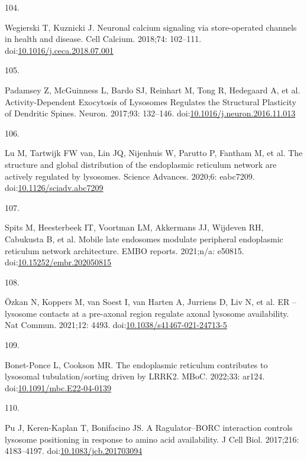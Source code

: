 \documentclass[
  12pt,
  a4paper,
]{book}
\newlength{\cslhangindent}
\newlength{\csllabelwidth}
\newlength{\cslentryspacingunit} %
\newenvironment{CSLReferences}[2] %
 {%
  \setlength{\parindent}{0pt}
  \ifodd #1
  \let\oldpar\par
  \def\par{\hangindent=\cslhangindent\oldpar}
  \fi
  \setlength{\parskip}{#2\cslentryspacingunit}
 }%
 {}
\newcommand{\CSLLeftMargin}[1]{\parbox[t]{\csllabelwidth}{#1}}
\newcommand{\CSLRightInline}[1]{\parbox[t]{\linewidth - \csllabelwidth}{#1}\break}
\begin{document}
\begin{CSLReferences}{0}{0}
\leavevmode{}%
\CSLLeftMargin{104. }%
\CSLRightInline{Wegierski T, Kuznicki J. Neuronal calcium signaling via store-operated channels in health and disease. Cell Calcium. 2018;74: 102--111. doi:\href{https://doi.org/10.1016/j.ceca.2018.07.001}{10.1016/j.ceca.2018.07.001}}

\leavevmode{}%
\CSLLeftMargin{105. }%
\CSLRightInline{Padamsey Z, McGuinness L, Bardo SJ, Reinhart M, Tong R, Hedegaard A, et al. Activity-{Dependent Exocytosis} of {Lysosomes Regulates} the {Structural Plasticity} of {Dendritic Spines}. Neuron. 2017;93: 132--146. doi:\href{https://doi.org/10.1016/j.neuron.2016.11.013}{10.1016/j.neuron.2016.11.013}}

\leavevmode{}%
\CSLLeftMargin{106. }%
\CSLRightInline{Lu M, Tartwijk FW van, Lin JQ, Nijenhuis W, Parutto P, Fantham M, et al. The structure and global distribution of the endoplasmic reticulum network are actively regulated by lysosomes. Science Advances. 2020;6: eabc7209. doi:\href{https://doi.org/10.1126/sciadv.abc7209}{10.1126/sciadv.abc7209}}

\leavevmode{}%
\CSLLeftMargin{107. }%
\CSLRightInline{Spits M, Heesterbeek IT, Voortman LM, Akkermans JJ, Wijdeven RH, Cabukusta B, et al. Mobile late endosomes modulate peripheral endoplasmic reticulum network architecture. EMBO reports. 2021;n/a: e50815. doi:\href{https://doi.org/10.15252/embr.202050815}{10.15252/embr.202050815}}

\leavevmode{}%
\CSLLeftMargin{108. }%
\CSLRightInline{Özkan N, Koppers M, van Soest I, van Harten A, Jurriens D, Liv N, et al. {ER} -- lysosome contacts at a pre-axonal region regulate axonal lysosome availability. Nat Commun. 2021;12: 4493. doi:\href{https://doi.org/10.1038/s41467-021-24713-5}{10.1038/s41467-021-24713-5}}

\leavevmode{}%
\CSLLeftMargin{109. }%
\CSLRightInline{Bonet-Ponce L, Cookson MR. The endoplasmic reticulum contributes to lysosomal tubulation/sorting driven by {LRRK2}. MBoC. 2022;33: ar124. doi:\href{https://doi.org/10.1091/mbc.E22-04-0139}{10.1091/mbc.E22-04-0139}}

\leavevmode{}%
\CSLLeftMargin{110. }%
\CSLRightInline{Pu J, Keren-Kaplan T, Bonifacino JS. A {Ragulator}--{BORC} interaction controls lysosome positioning in response to amino acid availability. J Cell Biol. 2017;216: 4183--4197. doi:\href{https://doi.org/10.1083/jcb.201703094}{10.1083/jcb.201703094}}


\end{CSLReferences}
\end{document}
